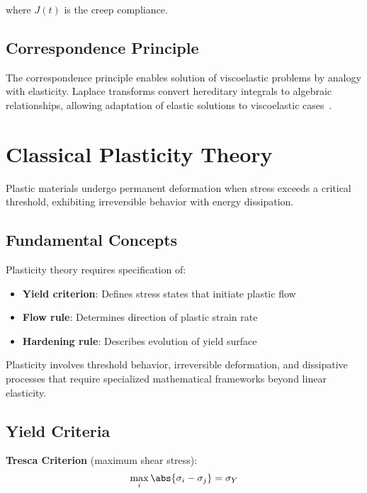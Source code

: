 where $J(t)$ is the creep compliance.

\subsection{Correspondence Principle}

The correspondence principle enables solution of viscoelastic problems by analogy with elasticity. Laplace transforms convert hereditary integrals to algebraic relationships, allowing adaptation of elastic solutions to viscoelastic cases~\autocite{Sadd.2019}.

\section{Classical Plasticity Theory}

Plastic materials undergo permanent deformation when stress exceeds a critical threshold, exhibiting irreversible behavior with energy dissipation.

\subsection{Fundamental Concepts}

Plasticity theory requires specification of:
\begin{itemize}
\item \textbf{Yield criterion}: Defines stress states that initiate plastic flow
\item \textbf{Flow rule}: Determines direction of plastic strain rate
\item \textbf{Hardening rule}: Describes evolution of yield surface
\end{itemize}

\begin{keypoint}
Plasticity involves threshold behavior, irreversible deformation, and dissipative processes that require specialized mathematical frameworks beyond linear elasticity.
\end{keypoint}

\subsection{Yield Criteria}

\textbf{Tresca Criterion} (maximum shear stress):
\begin{equation}
\max_i \abs{\sigma_i - \sigma_j} = \sigma_Y
\end{equation}

